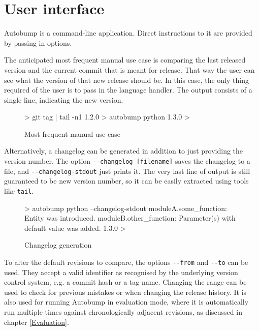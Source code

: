 \documentclass{l4proj}
\newcommand\genericstyle{\lstset{basicstyle=\ttm}}
\newcommand\codeinline[1]{{\genericstyle\lstinline!#1!}}
\begin{document}
\section{User interface}

Autobump is a command-line application. Direct instructions to it are
provided by passing in options.

The anticipated most frequent manual use case is comparing the last
released version and the current commit that is meant for release.
That way the user can see what the version of that new release should
be. In this case, the only thing required of the user is to pass in
the language handler. The output consists of a single line, indicating
the new version.

\begin{figure}[H]
\centering
\caption{Most frequent manual use case}
\begin{Bverbatim}
> git tag | tail -n1
1.2.0
> autobump python
1.3.0
>
\end{Bverbatim}
\end{figure}

Alternatively, a changelog can be generated in addition to just
providing the version number. The option \codeinline{--changelog
[filename]} saves the changelog to a file, and
\codeinline{--changelog-stdout} just prints it. The very last line of
output is still guaranteed to be new version number, so it can be
easily extracted using tools like \codeinline{tail}.

\begin{figure}[H]
\centering
\caption{Changelog generation}
\begin{Bverbatim}
> autobump python --changelog-stdout
moduleA.some_function: Entity was introduced.
moduleB.other_function: Parameter(s) with default value was added.
1.3.0
>
\end{Bverbatim}
\end{figure}

To alter the default revisions to compare, the options
\codeinline{--from} and \codeinline{--to} can be used. They accept a
valid identifier as recognised by the underlying version control
system, e.g. a commit hash or a tag name. Changing the range can be
used to check for previous mistakes or when changing the release
history. It is also used for running Autobump in evaluation mode,
where it is automatically run multiple times against chronologically
adjacent revisions, as discussed in chapter \ref{Evaluation}.
\end{document}
